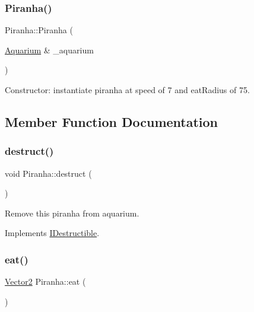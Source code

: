 \subsubsection{\texorpdfstring{Piranha()}{Piranha()}}
{\footnotesize\ttfamily Piranha\+::\+Piranha (\begin{DoxyParamCaption}\item[{\mbox{\hyperlink{class_aquarium}{Aquarium}} \&}]{\+\_\+aquarium }\end{DoxyParamCaption})}



Constructor\+: instantiate piranha at speed of 7 and eat\+Radius of 75. 



\subsection{Member Function Documentation}
\mbox{\label{class_piranha_a79c586a13bed4fb4aaa1b99c41c93c5a}} 
\subsubsection{\texorpdfstring{destruct()}{destruct()}}
{\footnotesize\ttfamily void Piranha\+::destruct (\begin{DoxyParamCaption}{ }\end{DoxyParamCaption})\hspace{0.3cm}{\ttfamily [virtual]}}



Remove this piranha from aquarium. 



Implements \mbox{\hyperlink{class_i_destructible_a63016d1bb4daa0a726fc8add9a0be62d}{I\+Destructible}}.

\mbox{\label{class_piranha_a125847235bdbd0e8c676dcada0d86c14}} 
\subsubsection{\texorpdfstring{eat()}{eat()}}
{\footnotesize\ttfamily \mbox{\hyperlink{struct_vector2}{Vector2}} Piranha\+::eat (\begin{DoxyParamCaption}{ }\end{DoxyParamCaption})\hspace{0.3cm}{\ttfamily [virtual]}}



